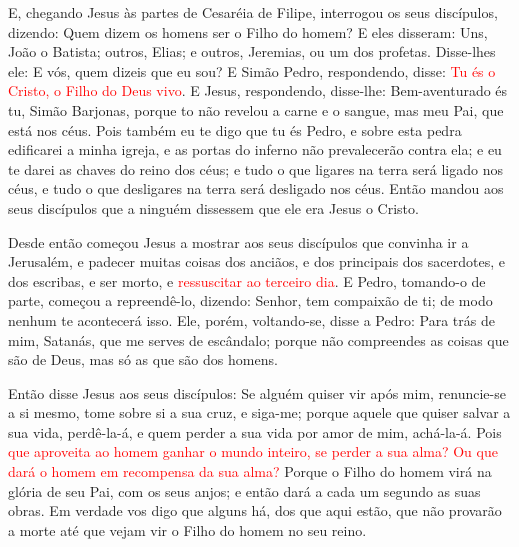 E, chegando Jesus às partes de Cesaréia de Filipe, interrogou os
seus discípulos, dizendo: Quem dizem os homens ser o Filho do homem?
E eles disseram: Uns, João o Batista; outros, Elias; e
outros, Jeremias, ou um dos profetas. Disse-lhes ele: E vós,
quem dizeis que eu sou? E Simão Pedro, respondendo, disse:
\textcolor{red}{Tu és o Cristo, o Filho do Deus vivo}. E Jesus,
respondendo, disse-lhe: Bem-aventurado és tu, Simão Barjonas, porque
to não revelou a carne e o sangue, mas meu Pai, que está nos céus.
Pois também eu te digo que tu és Pedro, e sobre esta pedra
edificarei a minha igreja, e as portas do inferno não prevalecerão
contra ela; e eu te darei as chaves do reino dos céus; e tudo
o que ligares na terra será ligado nos céus, e tudo o que desligares
na terra será desligado nos céus. Então mandou aos seus
discípulos que a ninguém dissessem que ele era Jesus o Cristo.

Desde então começou Jesus a mostrar aos seus discípulos que
convinha ir a Jerusalém, e padecer muitas coisas dos anciãos, e dos
principais dos sacerdotes, e dos escribas, e ser morto, e
\textcolor{red}{ressuscitar ao terceiro dia}. E Pedro, tomando-o de
parte, começou a repreendê-lo, dizendo: Senhor, tem compaixão de ti;
de modo nenhum te acontecerá isso. Ele, porém, voltando-se,
disse a Pedro: Para trás de mim, Satanás, que me serves de
escândalo; porque não compreendes as coisas que são de Deus, mas só
as que são dos homens.

Então disse Jesus aos seus discípulos: Se alguém quiser vir após
mim, renuncie-se a si mesmo, tome sobre si a sua cruz, e siga-me;
porque aquele que quiser salvar a sua vida, perdê-la-á, e
quem perder a sua vida por amor de mim, achá-la-á. Pois
\textcolor{red}{que aproveita ao homem ganhar o mundo inteiro, se perder a
sua alma? Ou que dará o homem em recompensa da sua alma?}
Porque o Filho do homem virá na glória de seu Pai, com os
seus anjos; e então dará a cada um segundo as suas obras. Em
verdade vos digo que alguns há, dos que aqui estão, que não provarão
a morte até que vejam vir o Filho do homem no seu reino.

\medskip

